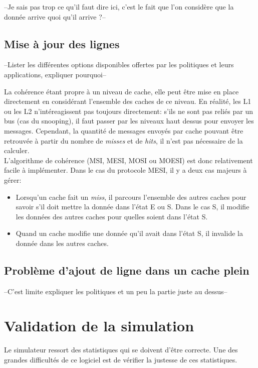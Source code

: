 --Je sais pas trop ce qu'il faut dire ici, c'est le fait que l'on considère que la donnée arrive quoi qu'il arrive ?--

\subsection{Mise à jour des lignes}

--Lister les différentes options disponibles offertes par les politiques et leurs applications, expliquer pourquoi--

La cohérence étant propre à un niveau de cache, elle peut être mise en place directement en considérant l'ensemble des caches de ce niveau. En réalité, les L1 ou les L2 n'intéreagissent pas toujours directement: s'ils ne sont pas reliés par un bus (cas du snooping), il faut passer par les niveaux haut dessus pour envoyer les messages. Cependant, la quantité de messages envoyés par cache pouvant être retrouvée à partir du nombre de \textit{misses} et de \textit{hits}, il n'est pas nécessaire de la calculer. \\

L'algorithme de cohérence (MSI, MESI, MOSI ou MOESI) est donc relativement facile à implémenter. Dans le cas du protocole MESI, il y a deux cas majeurs à gérer: \\
\begin{itemize}
\item Lorsqu'un cache fait un \textit{miss}, il parcours l'ensemble des autres caches pour savoir s'il doit mettre la donnée dans l'état E ou S. Dans le cas S, il modifie les données des autres caches pour quelles soient dans l'état S.
\item Quand un cache modifie une donnée qu'il avait dans l'état S, il invalide la donnée dans les autres caches.
\end{itemize}

\subsection{Problème d'ajout de ligne dans un cache plein}

--C'est limite expliquer les politiques et un peu la partie juste au dessus--

\section{Validation de la simulation}

Le simulateur ressort des statistiques qui se doivent d'être correcte. Une des grandes difficultés de ce logiciel est de vérifier la justesse de ces statistiques.

